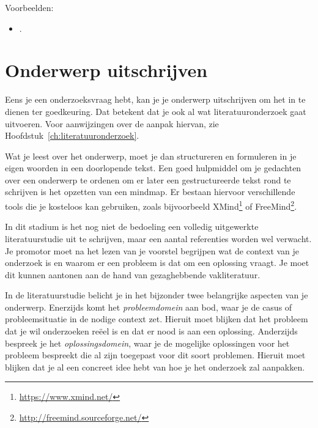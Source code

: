 Voorbeelden:

\begin{itemize}
  \item {} \autocite{Cluyse2023}.
\end{itemize}



\section{Onderwerp uitschrijven}%
\label{sec:onderwerp_uitschrijven}

Eens je een onderzoeksvraag hebt, kan je je onderwerp uitschrijven om het in te dienen ter goedkeuring. Dat betekent dat je ook al wat literatuuronderzoek gaat uitvoeren. Voor aanwijzingen over de aanpak hiervan, zie Hoofdstuk~\ref{ch:literatuuronderzoek}.

Wat je leest over het onderwerp, moet je dan structureren en formuleren in je eigen woorden in een doorlopende tekst. Een goed hulpmiddel om je gedachten over een onderwerp te ordenen om er later een gestructureerde tekst rond te schrijven is het opzetten van een mindmap. Er bestaan hiervoor verschillende tools die je kosteloos kan gebruiken, zoals bijvoorbeeld XMind\footnote{\url{https://www.xmind.net/}} of FreeMind\footnote{\url{http://freemind.sourceforge.net/}}.

In dit stadium is het nog niet de bedoeling een volledig uitgewerkte literatuurstudie uit te schrijven, maar een aantal referenties worden wel verwacht. Je promotor moet na het lezen van je voorstel begrijpen wat de context van je onderzoek is en waarom er een probleem is dat om een oplossing vraagt. Je moet dit kunnen aantonen aan de hand van gezaghebbende vakliteratuur.

In de literatuurstudie belicht je in het bijzonder twee belangrijke aspecten van je onderwerp. Enerzijds komt het \emph{probleemdomein} aan bod, waar je de casus of probleemsituatie in de nodige context zet. Hieruit moet blijken dat het probleem dat je wil onderzoeken reëel is en dat er nood is aan een oplossing. Anderzijds bespreek je het \emph{oplossingsdomein}, waar je de mogelijke oplossingen voor het probleem bespreekt die al zijn toegepast voor dit soort problemen. Hieruit moet blijken dat je al een concreet idee hebt van hoe je het onderzoek zal aanpakken.

